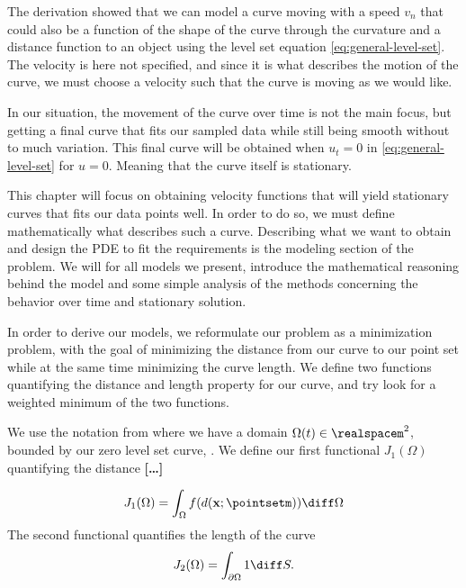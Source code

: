 \newpage
The derivation showed that we can model a curve moving with a speed $v_n$ that could also be a function of the shape of the curve through the curvature and a distance function to an object using the level set equation \eqref{eq:general-level-set}. The velocity is here not specified, and since it is what describes the motion of the curve, we must choose a velocity such that the curve is moving as we would like.

In our situation, the movement of the curve over time is not the main focus, but getting a final curve that fits our sampled data while still being smooth without to much variation. This final curve will be obtained when $u_t=0$ in \eqref{eq:general-level-set} for $u=0$. Meaning that the curve itself is stationary. 

This chapter will focus on obtaining velocity functions that will yield stationary curves that fits our data points well. In order to do so, we must define mathematically what describes such a curve. Describing what we want to obtain and design the PDE to fit the requirements is the modeling section of the problem. We will for all models we present, introduce the mathematical reasoning behind the model and some simple analysis of the methods concerning the behavior over time and stationary solution.

In order to derive our models, we reformulate our problem as a minimization problem, with the goal of minimizing the distance from our curve to our point set while at the same time minimizing the curve length. We define two functions quantifying the distance and length property for our curve, and try look for a weighted minimum of the two functions. 

We use the notation from  where we have a domain $\Omega(t)\in \realspacem^2$, bounded by our zero level set curve, \curve. We define our first functional $J_1(\Omega)$ quantifying the distance \textbf{[\dots]} 

\begin{equation}
    J_1(\Omega) = \int_{\Omega} f(d(\mathbf{x};\pointsetm)) \diff \Omega
    \label{eq:minimization-j1}
\end{equation}
The second functional quantifies the length of the curve
\begin{equation}
    J_2(\Omega) = \int_{\partial \Omega} 1 \diff S.
    \label{eq:minimization-j2}
\end{equation}

